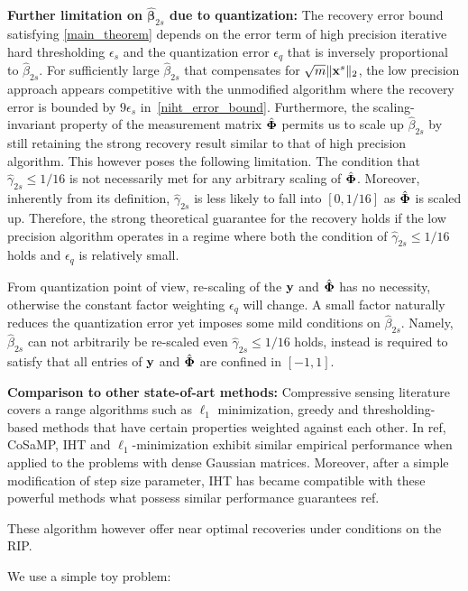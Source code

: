 \documentclass{article}
\begin{document}
{\bf Further limitation on $\hat{\boldsymbol{\beta}}_{2s}$ due to quantization:} The recovery error bound satisfying \ref{main_theorem} depends on the error term of high precision iterative hard thresholding $\epsilon_s$ and the quantization error $\epsilon_q$ that is inversely proportional to $\hat{\beta}_{2s}$. For sufficiently large $\hat{\beta}_{2s}$ that compensates for $\sqrt{m} \|{\bf x}^s \|_2$, the low precision approach appears competitive with the unmodified algorithm where the recovery error is bounded by $9\epsilon_s$ in~\ref{niht_error_bound}. Furthermore, the scaling-invariant property of the measurement matrix $\hat{\bf \Phi}$ permits us to scale up $\hat{\beta}_{2s}$ by still retaining the strong recovery result similar to that of high precision algorithm. This however poses the following limitation. The condition that $\hat{\gamma}_{2s}\leq 1/16$ is not necessarily met for any arbitrary scaling of $\hat{\bf \Phi}$. Moreover, inherently from its definition, $\hat{\gamma}_{2s}$ is less likely to fall into $[0, 1/16]$ as $\hat{\bf \Phi}$ is scaled up. Therefore, the strong theoretical guarantee for the recovery holds if the low precision algorithm operates in a regime where both the condition of $\hat{\gamma}_{2s}\leq 1/16$ holds and $\epsilon_q$ is relatively small.

From quantization point of view, re-scaling of the ${\bf y}$ and $\hat{\bf \Phi}$ has no necessity,
otherwise the constant factor weighting $\epsilon_q$ will change. A small factor naturally reduces the quantization error yet imposes some mild conditions on $\hat{\beta}_{2s}$. Namely, $\hat{\beta}_{2s}$ can not arbitrarily be re-scaled even $\hat{\gamma}_{2s}\leq 1/16$ holds, instead is required to satisfy that all entries of ${\bf y}$ and $\hat{\bf \Phi}$ are confined in $[-1, 1]$.

{\bf Comparison to other state-of-art methods:} Compressive sensing literature covers a range algorithms such as $\ell_1$ minimization, greedy and thresholding-based methods that have certain properties weighted against each other. In ref, CoSaMP, IHT and $\ell_1$-minimization exhibit similar empirical performance when applied to the problems with dense Gaussian matrices. Moreover, after a simple modification of step size parameter, IHT has became compatible with these powerful methods what possess similar performance guarantees ref. 

These algorithm however offer near optimal recoveries under conditions on the RIP. 

We use a simple toy problem: 
\end{document}
